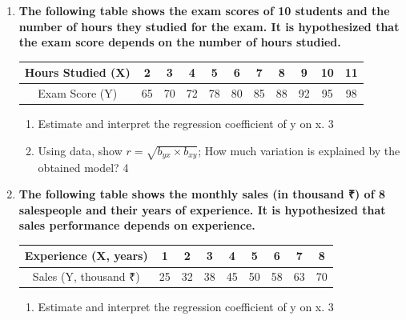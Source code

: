 \documentclass[a4paper,oneside]{book}
\begin{document}
\begin{enumerate}
\begin{enumerate}
  \begin{enumerate}
    \item  
	Make a scatter plot using the data and state the potential direction and strength of the relationship between the variables. \hfill 3
    \item
	Find the correlation and interpret. \hfill 4
  \end{enumerate}
 
  \item
	  \textbf{The following table shows the exam scores of 10 students and the number of hours they studied for the exam. It is hypothesized that the exam score depends on the number of hours studied.} 
	  
\begin{table}[h!]
\centering
\begin{tabular}{c|c|c|c|c|c|c|c|c|c|c}
Hours Studied (X) & 2 & 3 & 4 & 5 & 6 & 7 & 8 & 9 & 10 & 11 \\ \hline
Exam Score (Y) & 65 & 70 & 72 & 78 & 80 & 85 & 88 & 92 & 95 & 98 \\
\end{tabular}
\end{table}
  
  \begin{enumerate}
    \item  
	Estimate and interpret the regression coefficient of y on x. \hfill 3
    \item
	Using data, show $r = \sqrt{b_{yx} \times b_{xy}}$; How much variation is explained by the obtained model? \hfill 4
  \end{enumerate}
  
  \item
  \textbf{The following table shows the monthly sales (in thousand ₹) of 8 salespeople and their years of experience. It is hypothesized that sales performance depends on experience.}

\begin{table}[h!]
\centering
\begin{tabular}{c|c|c|c|c|c|c|c|c}
Experience (X, years) & 1 & 2 & 3 & 4 & 5 & 6 & 7 & 8 \\ \hline
Sales (Y, thousand ₹) & 25 & 32 & 38 & 45 & 50 & 58 & 63 & 70 \\
\end{tabular}
\end{table}

\begin{enumerate}
    \item
    Estimate and interpret the regression coefficient of y on x. \hfill 3
    

\end{enumerate}
\end{enumerate}
\end{enumerate}
\end{document}
